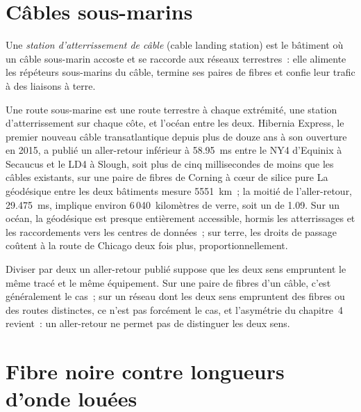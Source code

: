 \section{Câbles sous-marins}

\begin{definition}\label{def:nw:long-haul-fibre:cls}
Une \emph{station d'atterrissement de câble} (cable landing station) est le bâtiment où un câble sous-marin accoste et se raccorde aux
réseaux terrestres~: elle alimente les répéteurs sous-marins du câble, termine ses paires de fibres et confie leur trafic à des liaisons à terre.
\end{definition}

Une route sous-marine est une route terrestre à chaque extrémité, une station d'atterrissement sur chaque côte, et l'océan entre les deux. Hibernia Express, le premier nouveau
câble transatlantique depuis plus de douze ans à son ouverture en 2015, a publié un aller-retour inférieur à \qty{58.95}{\milli\second} entre le NY4 d'Equinix
à Secaucus et le LD4 à Slough, soit plus de cinq millisecondes de moins que les câbles existants, sur une paire de fibres de Corning à cœur de silice pure
La géodésique entre les deux bâtiments mesure \qty{5551}{\kilo\metre}~; la moitié de l'aller-retour, \qty{29.475}{\milli\second}, implique environ
6\,040~kilomètres de verre, soit un  de 1.09. Sur un océan, la géodésique est presque entièrement accessible, hormis les atterrissages et les raccordements
vers les centres de données~; sur terre, les droits de passage coûtent à la route de Chicago deux fois plus, proportionnellement.

\begin{remark}\label{rem:nw:long-haul-fibre:half}
Diviser par deux un aller-retour publié suppose que les deux sens empruntent le même tracé et le même équipement. Sur une paire de fibres d'un câble, c'est généralement le cas~; sur un réseau dont
les deux sens empruntent des fibres ou des routes distinctes, ce n'est pas forcément le cas, et l'asymétrie du chapitre~4 revient~: un aller-retour ne permet pas de distinguer les deux
sens.
\end{remark}

\section{Fibre noire contre longueurs d'onde louées}

